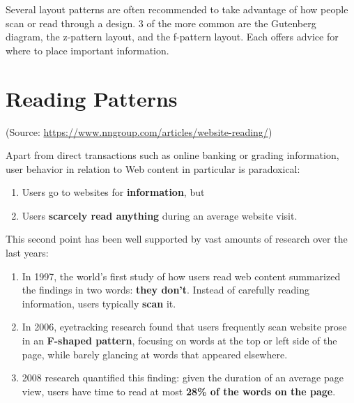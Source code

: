 Several layout patterns are often recommended to take advantage of how people scan or read through a design. 3 of the more common are the Gutenberg diagram, the z-pattern layout, and the f-pattern layout. Each offers advice for where to place important information.



\section{Reading Patterns} %
\label{sub:reading_patterns}
(Source: \url{https://www.nngroup.com/articles/website-reading/})

Apart from direct transactions such as online banking or grading information, user behavior in relation to Web content in particular is paradoxical:
\begin{enumerate}
	\item Users go to websites for \textbf{information}, but
	\item Users \textbf{scarcely read anything} during an average website visit.
\end{enumerate}

This second point has been well supported by vast amounts of research over the last years:
\begin{enumerate}
	\item In 1997, the world's first study of how users read web content summarized the findings in two words: \textbf{they don't}. Instead of carefully reading information, users typically \textbf{scan} it.
	\item In 2006, eyetracking research found that users frequently scan website prose in an \textbf{F-shaped pattern}, focusing on words at the top or left side of the page, while barely glancing at words that appeared elsewhere.
	\item 2008 research quantified this finding: given the duration of an average page view, users have time to read at most \textbf{28\% of the words on the page}.
\end{enumerate}



%

